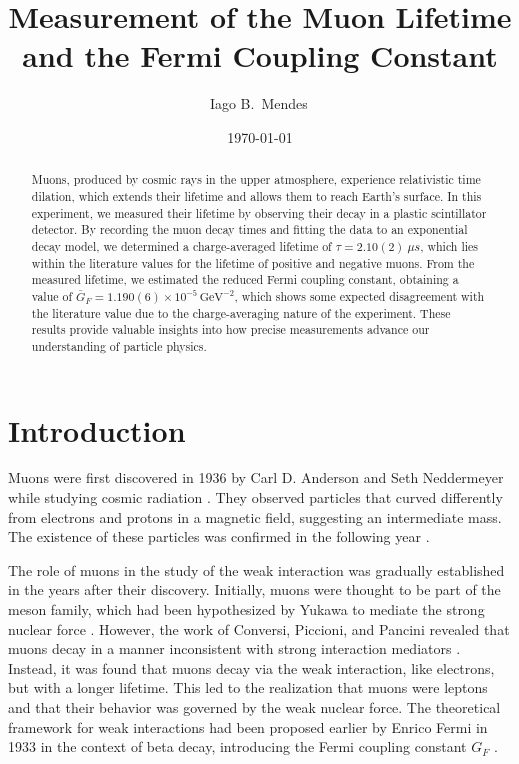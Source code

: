 \documentclass{../paper}
\begin{document}
\title{Measurement of the Muon Lifetime and the Fermi Coupling Constant}

\author{Iago B.~Mendes\,}

\date{\today}

\begin{abstract}
  Muons, produced by cosmic rays in the upper atmosphere, experience relativistic time dilation, which extends their lifetime and allows them to reach Earth's surface. In this experiment, we measured their lifetime by observing their decay in a plastic scintillator detector. By recording the muon decay times and fitting the data to an exponential decay model, we determined a charge-averaged lifetime of $\tau = 2.10(2) \ \mu s$, which lies within the literature values for the lifetime of positive and negative muons. From the measured lifetime, we estimated the reduced Fermi coupling constant, obtaining a value of $\bar G_F = 1.190(6) \times 10^{-5} \, \text{GeV}^{-2}$, which shows some expected disagreement with the literature value due to the charge-averaging nature of the experiment. These results provide valuable insights into how precise measurements advance our understanding of particle physics.
\end{abstract}

\maketitle

\section{Introduction}

Muons were first discovered in 1936 by Carl D. Anderson and Seth Neddermeyer while studying cosmic radiation \cite{Anderson1936}. They observed particles that curved differently from electrons and protons in a magnetic field, suggesting an intermediate mass. The existence of these particles was confirmed in the following year \cite{Street1937}.

The role of muons in the study of the weak interaction was gradually established in the years after their discovery. Initially, muons were thought to be part of the meson family, which had been hypothesized by Yukawa to mediate the strong nuclear force \cite{Yukawa1935}. However, the work of Conversi, Piccioni, and Pancini revealed that muons decay in a manner inconsistent with strong interaction mediators \cite{Conversi1946}. Instead, it was found that muons decay via the weak interaction, like electrons, but with a longer lifetime. This led to the realization that muons were leptons and that their behavior was governed by the weak nuclear force. The theoretical framework for weak interactions had been proposed earlier by Enrico Fermi in 1933 in the context of beta decay, introducing the Fermi coupling constant $G_F$ \cite{Fermi1933}.
\end{document}
